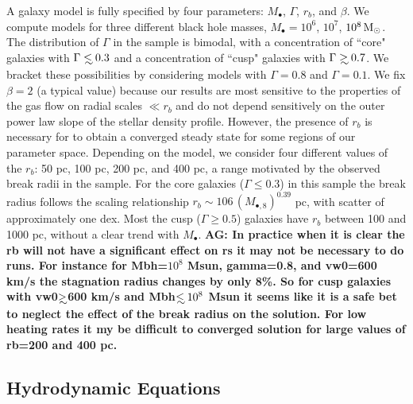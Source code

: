 \documentclass[usenatbib,fleqn]{mn2e}
\newcommand\lsim{\mathrel{\rlap{\lower4pt\hbox{\hskip1pt$\sim$}}
    \raise1pt\hbox{$<$}}}
\newcommand\gsim{\mathrel{\rlap{\lower4pt\hbox{\hskip1pt$\sim$}}
    \raise1pt\hbox{$>$}}}
\newcommand{\rb}{r_b}
\newcommand{\Mbh}[1][]{M_{\bullet#1}}
\newcommand{\Mbheight}{M_{\bullet,8}}
\begin{document}
A galaxy model is fully specified by four parameters: $\Mbh$,
$\Gamma$, $r_b$, and $\beta$.  We compute models for three different
black hole masses, $\Mbh = 10^6$, $10^7$, $10^8 \,{\rm M_\odot}$.  The
distribution of $\Gamma$ in the \citet{LauerFaber+:2007a} sample is
bimodal, with a concentration of ``core" galaxies with $\Gamma \lsim
0.3$ and a concentration of ``cusp" galaxies with $\Gamma \gsim 0.7$.
We bracket these possibilities by considering models with $\Gamma=0.8$
and $\Gamma=0.1$.  We fix $\beta = 2$ (a typical value) because our results are most sensitive to the
properties of the gas flow on radial scales $\ll r_b$ and do not depend sensitively on the outer power law slope of the stellar density profile. However, the presence of $\rb$ is necessary for to obtain a converged steady state for some regions of our parameter space.  Depending on the model, we
consider four different values of the $\rb$: 50 pc, 100 pc, 200 pc,
and 400 pc, a range motivated by the observed break radii in
the \citet{LauerFaber+:2007a} sample. For the core galaxies ($\Gamma \le$0.3) in this sample the break radius follows the scaling relationship $\rb\sim 106 \, (\Mbheight)^{0.39}$ pc, with scatter of
approximately one dex. Most the cusp ($\Gamma \ge0.5$) galaxies have
$\rb$ between 100 and 1000 pc, without a clear trend with $\Mbh$. {\bf AG: In practice when it is clear the rb will not have a
  significant effect on rs it may not be necessary to do runs. For
  instance for Mbh=$10^8$ Msun, gamma=0.8, and vw0=600 km/s the
  stagnation radius changes by only 8\%. So for cusp galaxies with
  vw0$\gsim$600 km/s and Mbh$\lsim 10^8$ Msun it seems like it is a
  safe bet to neglect the effect of the break radius on the
  solution. For low heating rates it my be difficult to converged
  solution for large values of rb=200 and 400 pc.}

\subsection{Hydrodynamic Equations}
\label{sec:hydro}
\end{document}
